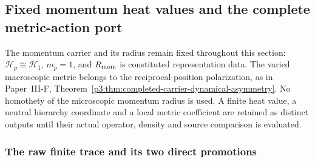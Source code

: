 \documentclass[12pt,a4paper]{article}
\begin{document}
\subsection{Fixed momentum heat values and the complete metric-action port}
\label{p3e:sec:v2218-fixed-momentum-action-port}

The momentum carrier and its radius remain fixed throughout this section:
\(\mathcal H_p\cong\mathcal H_1\), \(m_p=1\), and
\(R_{\rm mom}\) is constituted representation data.  The varied
macroscopic metric belongs to the reciprocal-position polarization, as in
Paper~III-F, Theorem~\ref{p3:thm:completed-carrier-dynamical-asymmetry}.
No homothety of the microscopic momentum radius is used.  A finite heat
value, a neutral hierarchy coordinate and a local metric coefficient are
retained as distinct outputs until their actual operator, density and
source comparison is evaluated.

\subsubsection{The raw finite trace and its two direct promotions}
\end{document}
